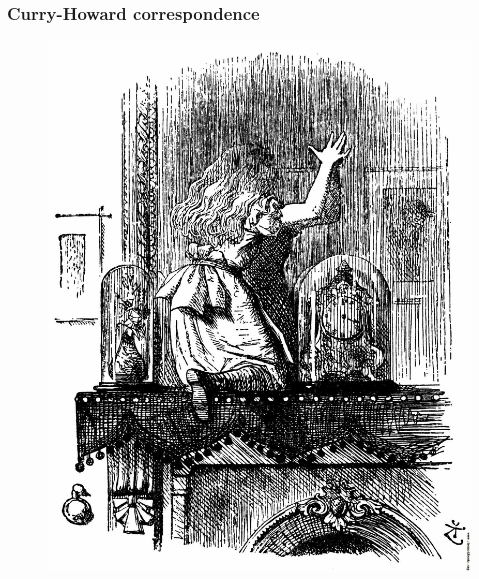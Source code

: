 \documentclass[
  xcolor={usenames,dvipsnames,svgnames},
  ]{beamer}
\begin{document}
\begin{frame}
  \frametitle{Curry-Howard correspondence}
  \begin{figure}
    \begin{minipage}{.5\textwidth}
      \includegraphics[width=\textwidth]{graphics/011-Into-the-looking-glass-q45-1764x2202.jpg}
    \end{minipage}%
    \begin{minipage}{.5\textwidth}

\end{minipage}
\end{figure}
\end{frame}
\end{document}
